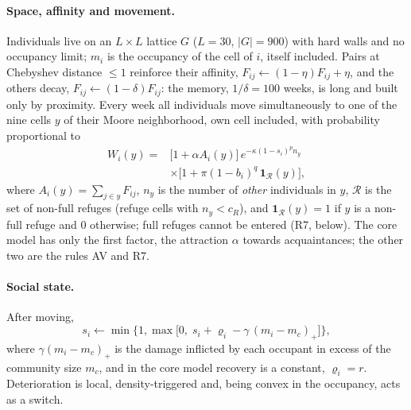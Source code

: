 \paragraph*{Space, affinity and movement.}
Individuals live on an $L\times L$ lattice $G$ ($L=30$, $|G|=900$) with hard walls and no occupancy limit; $m_i$ is
the occupancy of the cell of $i$, itself included. Pairs at Chebyshev distance $\le1$ reinforce their affinity,
$F_{ij}\leftarrow(1-\eta)F_{ij}+\eta$, and the others decay, $F_{ij}\leftarrow(1-\delta)F_{ij}$: the memory,
$1/\delta=100$ weeks, is long and built only by proximity. Every week all individuals move simultaneously to one of
the nine cells $y$ of their Moore neighborhood, own cell included, with probability proportional to
\begin{equation}
  \begin{split}
  W_i(y)={}&\bigl[1+\alpha A_i(y)\bigr]\,e^{-\kappa(1-s_i)^{p}n_y}\\
           &\times\bigl[1+\pi(1-b_i)^{q}\,\mathbf 1_{\mathcal R}(y)\bigr],
  \end{split}
  \label{eq:model-move}
\end{equation}
where $A_i(y)=\sum_{j\in y}F_{ij}$, $n_y$ is the number of \emph{other} individuals in $y$, $\mathcal R$ is the set
of non-full refuges (refuge cells with $n_y<c_R$), and $\mathbf 1_{\mathcal R}(y)=1$ if $y$ is a non-full refuge and 0
otherwise; full refuges cannot be entered (R7, below). The core model has only the first factor, the attraction $\alpha$ towards acquaintances; the
other two are the rules AV and R7.

\paragraph*{Social state.}
After moving,
\begin{equation}
  s_i\leftarrow\min\bigl\{1,\max\bigl[0,\;s_i+\varrho_i-\gamma\,(m_i-m_c)_+\bigr]\bigr\},
  \label{eq:model-social}
\end{equation}
where $\gamma(m_i-m_c)_+$ is the damage inflicted by each occupant in excess of the community size $m_c$, and in the
core model recovery is a constant, $\varrho_i=r$. Deterioration is local, density-triggered and, being convex in the
occupancy, acts as a switch.

